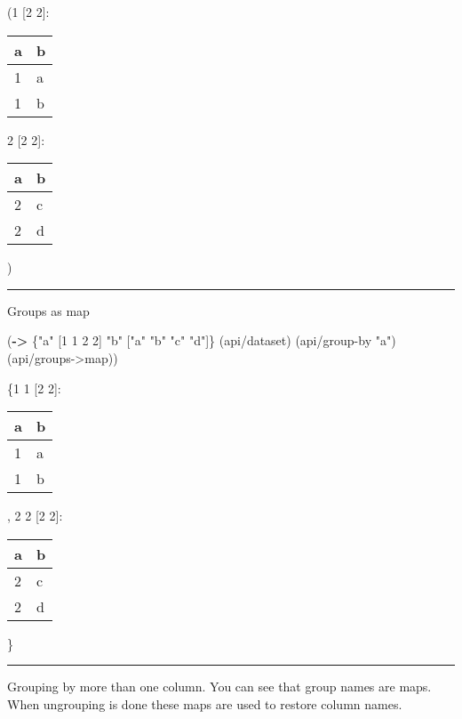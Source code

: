 \documentclass[]{article}
\newenvironment{Shaded}{\begin{snugshade}}{\end{snugshade}}
\newcommand{\KeywordTok}[1]{\textcolor[rgb]{0.13,0.29,0.53}{\textbf{#1}}}
\newcommand{\DecValTok}[1]{\textcolor[rgb]{0.00,0.00,0.81}{#1}}
\newcommand{\StringTok}[1]{\textcolor[rgb]{0.31,0.60,0.02}{#1}}
\newcommand{\NormalTok}[1]{#1}
\begin{document}
(1 {[}2 2{]}:

\begin{longtable}[]{@{}ll@{}}
\toprule
a & b\tabularnewline
\midrule
\endhead
1 & a\tabularnewline
1 & b\tabularnewline
\bottomrule
\end{longtable}

2 {[}2 2{]}:

\begin{longtable}[]{@{}ll@{}}
\toprule
a & b\tabularnewline
\midrule
\endhead
2 & c\tabularnewline
2 & d\tabularnewline
\bottomrule
\end{longtable}

)

\begin{center}\rule{0.5\linewidth}{0.5pt}\end{center}

Groups as map

\begin{Shaded}
\begin{Highlighting}[]
\NormalTok{(}\KeywordTok{->}\NormalTok{ \{}\StringTok{"a"}\NormalTok{ [}\DecValTok{1} \DecValTok{1} \DecValTok{2} \DecValTok{2}\NormalTok{]}
     \StringTok{"b"}\NormalTok{ [}\StringTok{"a"} \StringTok{"b"} \StringTok{"c"} \StringTok{"d"}\NormalTok{]\}}
\NormalTok{    (api/dataset)}
\NormalTok{    (api/group-by }\StringTok{"a"}\NormalTok{)}
\NormalTok{    (api/groups->map))}
\end{Highlighting}
\end{Shaded}

\{1 1 {[}2 2{]}:

\begin{longtable}[]{@{}ll@{}}
\toprule
a & b\tabularnewline
\midrule
\endhead
1 & a\tabularnewline
1 & b\tabularnewline
\bottomrule
\end{longtable}

, 2 2 {[}2 2{]}:

\begin{longtable}[]{@{}ll@{}}
\toprule
a & b\tabularnewline
\midrule
\endhead
2 & c\tabularnewline
2 & d\tabularnewline
\bottomrule
\end{longtable}

\}

\begin{center}\rule{0.5\linewidth}{0.5pt}\end{center}

Grouping by more than one column. You can see that group names are maps.
When ungrouping is done these maps are used to restore column names.
\end{document}
